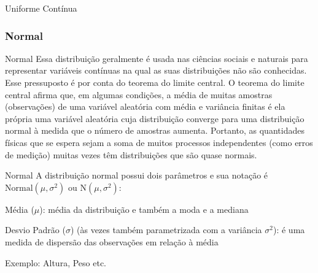 \begin{frame}{Uniforme Contínua}
    \centering
\end{frame}

\subsubsection{Normal}
\begin{frame}{Normal}
    Essa distribuição geralmente é usada nas ciências sociais e naturais para
    representar variáveis contínuas na qual as suas distribuições não são conhecidas.
    Esse pressuposto é por conta do teorema do limite central. O teorema do limite
    central afirma que, em algumas condições, a média de muitas amostras (observações)
    de uma variável aleatória com média e variância finitas é ela própria uma variável
    aleatória cuja distribuição converge para uma distribuição normal à medida que o
    número de amostras aumenta.
    \vfill
    Portanto, as quantidades físicas que se espera sejam a
    soma de muitos processos independentes (como erros de medição) muitas vezes têm
    distribuições que são quase normais.
\end{frame}

\begin{frame}{Normal}
    A distribuição normal possui dois parâmetros e sua notação é
    $\text{Normal}(\mu, \sigma^2)$ ou $\text{N}(\mu, \sigma^2)$:
    \begin{vfilleditems}
        \item Média ($\mu$): média da distribuição e também a moda e a mediana
        \item Desvio Padrão ($\sigma$) (às vezes também parametrizada com a variância $\sigma^2$): é uma medida de dispersão das observações em relação à média
    \end{vfilleditems}
    \vfill
    Exemplo: Altura, Peso etc.
\end{frame}

